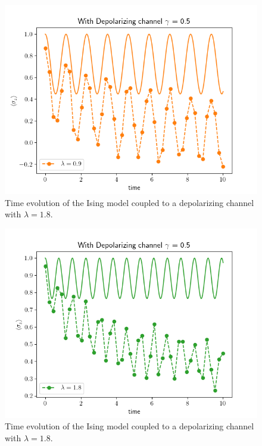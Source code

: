 \documentclass[12pt, twocolumn]{article}
\begin{document}
  \begin{figure}%
    \centering
    \includegraphics[width=\columnwidth]{images/DepolChannelLambda09.png}
    \caption{Time evolution of the Ising model coupled to a depolarizing channel with \( \lambda = 1.8 \).%
      \label{fig:DepolChannelLambda09}}
  \end{figure}

  \begin{figure}%
    \centering
    \includegraphics[width=\columnwidth]{images/DepolChannelLambda18.png}
    \caption{Time evolution of the Ising model coupled to a depolarizing channel with \( \lambda = 1.8 \).%
      \label{fig:DepolChannelLambda18}}
  \end{figure}
\end{document}
